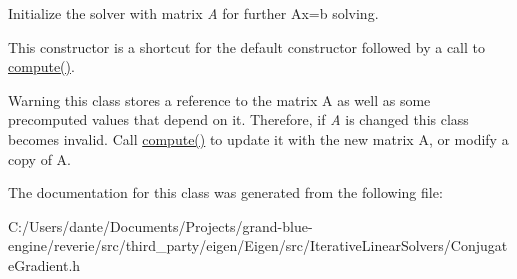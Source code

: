 Initialize the solver with matrix {\itshape A} for further {\ttfamily Ax=b} solving.

This constructor is a shortcut for the default constructor followed by a call to \mbox{\hyperlink{class_eigen_1_1_iterative_solver_base_a7dfa55c55e82d697bde227696a630914}{compute()}}.

\begin{DoxyWarning}{Warning}
this class stores a reference to the matrix A as well as some precomputed values that depend on it. Therefore, if {\itshape A} is changed this class becomes invalid. Call \mbox{\hyperlink{class_eigen_1_1_iterative_solver_base_a7dfa55c55e82d697bde227696a630914}{compute()}} to update it with the new matrix A, or modify a copy of A. 
\end{DoxyWarning}


The documentation for this class was generated from the following file\+:\begin{DoxyCompactItemize}
\item 
C\+:/\+Users/dante/\+Documents/\+Projects/grand-\/blue-\/engine/reverie/src/third\+\_\+party/eigen/\+Eigen/src/\+Iterative\+Linear\+Solvers/Conjugate\+Gradient.\+h\end{DoxyCompactItemize}
